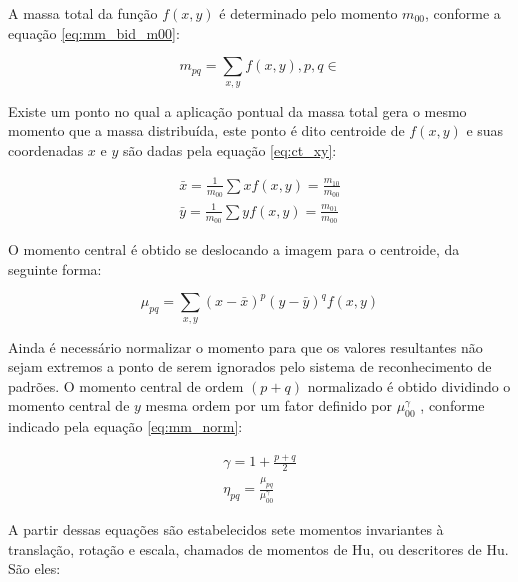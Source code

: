 A massa total da função $ f(x, y) $ é determinado pelo
momento $ m_{00} $, conforme a equação \ref{eq:mm_bid_m00}:

\begin{equation}\label{eq:mm_bid_m00}
m_{pq} = \sum_{x, y} f(x, y), p, q \in
\end{equation}

Existe um ponto no qual a aplicação pontual da massa total gera o mesmo momento
que a massa distribuída, este ponto é dito centroide de $ f(x, y) $ e suas
coordenadas $ x $ e $ y $ são dadas pela equação \ref{eq:ct_xy}:

\begin{subequations}\label{eq:ct_xy}
\begin{align}
    \bar{x} = \frac{1}{ m_{00} } \sum x f(x, y) = \frac{ m_{10} }{ m_{00} } \\
    \bar{y} = \frac{1}{ m_{00} } \sum y f(x, y) = \frac{ m_{01} }{ m_{00} }
\end{align}
\end{subequations}

O momento central é obtido se deslocando a imagem para o centroide,
da seguinte forma:

\begin{equation}\label{eq:mm_ctr}
\mu_{pq} = \sum_{x, y} (x - \bar{x})^p (y - \bar{y})^q f(x, y)
\end{equation}

Ainda é necessário normalizar o momento para que os valores resultantes não sejam
extremos a ponto de serem ignorados pelo sistema de reconhecimento de padrões. O
momento central de ordem $ (p+q) $ normalizado é obtido dividindo o momento
central de $ y $ mesma ordem por um fator definido por $ \mu_{00}^\gamma $ ,
conforme indicado pela equação \ref{eq:mm_norm}:

\begin{subequations}\label{eq:mm_norm}
\begin{align}
    \gamma = 1 + \frac{ p + q }{2} \\
    \eta_{pq} = \frac{ \mu_{pq} }{ \mu_{00}^\gamma }
\end{align}
\end{subequations}

A partir dessas equações são estabelecidos sete momentos invariantes à translação,
 rotação e escala, chamados de momentos de Hu, ou descritores de Hu. São eles:

